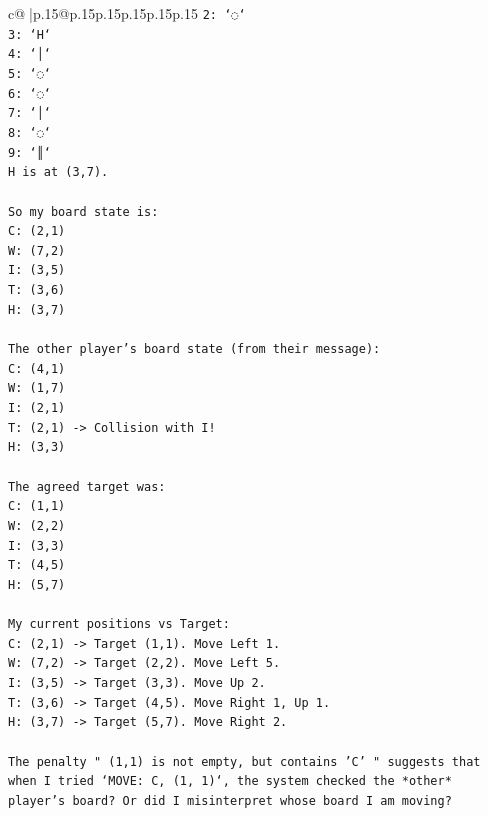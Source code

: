 \documentclass{article}
\begin{document}
{\begin{supertabular}{c@{$\;$}|p{.15\linewidth}@{}p{.15\linewidth}p{.15\linewidth}p{.15\linewidth}p{.15\linewidth}p{.15\linewidth}}
{{{\texttt{2: `◌`} \\
\texttt{3: `H`} \\
\texttt{4: `│`} \\
\texttt{5: `◌`} \\
\texttt{6: `◌`} \\
\texttt{7: `│`} \\
\texttt{8: `◌`} \\
\texttt{9: `║`} \\
\texttt{H is at (3,7).} \\
\\ 
\texttt{So my board state is:} \\
\texttt{C: (2,1)} \\
\texttt{W: (7,2)} \\
\texttt{I: (3,5)} \\
\texttt{T: (3,6)} \\
\texttt{H: (3,7)} \\
\\ 
\texttt{The other player's board state (from their message):} \\
\texttt{C: (4,1)} \\
\texttt{W: (1,7)} \\
\texttt{I: (2,1)} \\
\texttt{T: (2,1) {-}> Collision with I!} \\
\texttt{H: (3,3)} \\
\\ 
\texttt{The agreed target was:} \\
\texttt{C: (1,1)} \\
\texttt{W: (2,2)} \\
\texttt{I: (3,3)} \\
\texttt{T: (4,5)} \\
\texttt{H: (5,7)} \\
\\ 
\texttt{My current positions vs Target:} \\
\texttt{C: (2,1) {-}> Target (1,1). Move Left 1.} \\
\texttt{W: (7,2) {-}> Target (2,2). Move Left 5.} \\
\texttt{I: (3,5) {-}> Target (3,3). Move Up 2.} \\
\texttt{T: (3,6) {-}> Target (4,5). Move Right 1, Up 1.} \\
\texttt{H: (3,7) {-}> Target (5,7). Move Right 2.} \\
\\ 
\texttt{The penalty " (1,1) is not empty, but contains 'C' " suggests that when I tried `MOVE: C, (1, 1)`, the system checked the *other* player's board? Or did I misinterpret whose board I am moving?} \\
}}}
\end{supertabular}}
\end{document}
